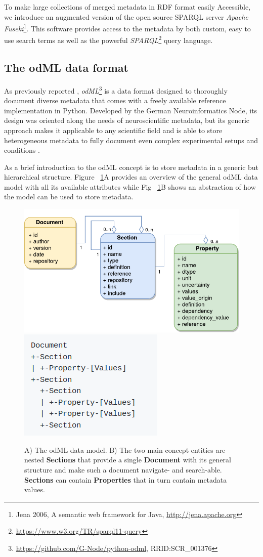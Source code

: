 \documentclass{article}
\begin{document}
To make large collections of merged metadata in RDF format easily Accessible, we introduce an augmented version of the open source SPARQL server \textit{Apache Fuseki}\footnote{Jena 2006, A semantic web framework for Java, \url{http://jena.apache.org}}. This software provides access to the metadata by both custom, easy to use search terms as well as the powerful \textit{SPARQL}\footnote{\url{https://www.w3.org/TR/sparql11-query}} query language.

\subsection{The odML data format} \label{sec:odml_intro}
As previously reported \cite{Grewe_2011}, \textit{odML}\footnote{\url{https://github.com/G-Node/python-odml}, RRID:SCR\_001376} is a data format designed to thoroughly document diverse metadata that comes with a freely available reference implementation in Python. Developed by the German Neuroinformatics Node, its design was oriented along the needs of neuroscientific metadata, but its generic approach makes it applicable to any scientific field and is able to store heterogeneous metadata to fully document even complex experimental setups and conditions \cite{Zehl_2016}.

As a brief introduction to the odML concept is to store metadata in a generic but hierarchical structure. Figure ~\ref{fig:odmlModel}A provides an overview of the general odML data model with all its available attributes while Fig ~\ref{fig:odmlModel}B shows an abstraction of how the model can be used to store metadata.

\begin{figure}
\begin{center}
\includegraphics[width=0.60\columnwidth]{figures/figOdmlModelA.pdf}
\includegraphics[width=0.40\columnwidth]{figures/figOdmlModelB.png}
\caption{
A) The odML data model. B) The two main concept entities are nested \textbf{Sections} that provide a single \textbf{Document} with its general structure and make such a document navigate- and search-able. \textbf{Sections} can contain \textbf{Properties} that in turn contain metadata values.
}
\label{fig:odmlModel}
\end{center}
\end{figure}
\end{document}
